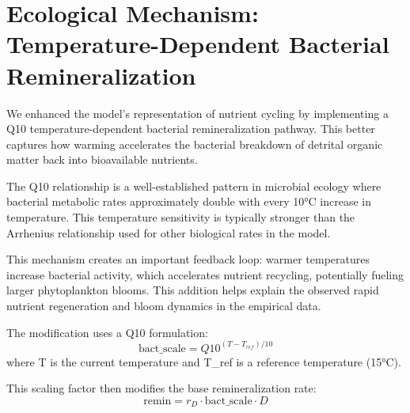 \section{Ecological Mechanism: Temperature-Dependent Bacterial Remineralization}

We enhanced the model's representation of nutrient cycling by implementing a Q10 temperature-dependent bacterial remineralization pathway. This better captures how warming accelerates the bacterial breakdown of detrital organic matter back into bioavailable nutrients.

The Q10 relationship is a well-established pattern in microbial ecology where bacterial metabolic rates approximately double with every 10°C increase in temperature. This temperature sensitivity is typically stronger than the Arrhenius relationship used for other biological rates in the model.

This mechanism creates an important feedback loop: warmer temperatures increase bacterial activity, which accelerates nutrient recycling, potentially fueling larger phytoplankton blooms. This addition helps explain the observed rapid nutrient regeneration and bloom dynamics in the empirical data.

The modification uses a Q10 formulation:
\[ \text{bact\_scale} = Q10^{(T - T_{ref})/10} \]
where T is the current temperature and T_{ref} is a reference temperature (15°C).

This scaling factor then modifies the base remineralization rate:
\[ \text{remin} = r_D \cdot \text{bact\_scale} \cdot D \]
